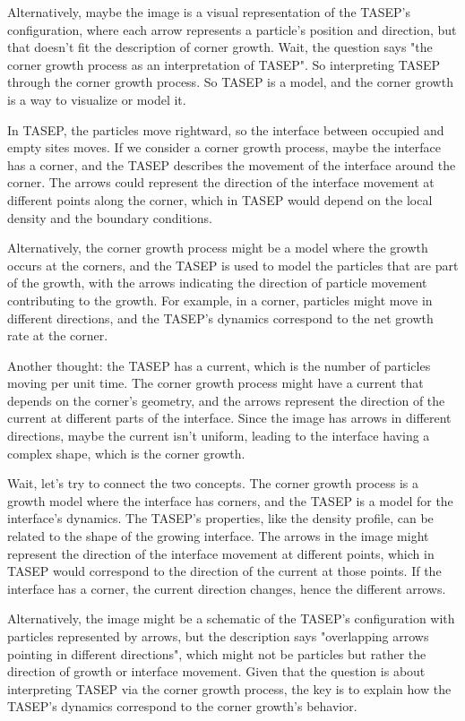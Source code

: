 Alternatively, maybe the image is a visual representation of the TASEP's configuration, where each arrow represents a particle's position and direction, but that doesn't fit the description of corner growth. Wait, the question says "the corner growth process as an interpretation of TASEP". So interpreting TASEP through the corner growth process. So TASEP is a model, and the corner growth is a way to visualize or model it.

In TASEP, the particles move rightward, so the interface between occupied and empty sites moves. If we consider a corner growth process, maybe the interface has a corner, and the TASEP describes the movement of the interface around the corner. The arrows could represent the direction of the interface movement at different points along the corner, which in TASEP would depend on the local density and the boundary conditions.

Alternatively, the corner growth process might be a model where the growth occurs at the corners, and the TASEP is used to model the particles that are part of the growth, with the arrows indicating the direction of particle movement contributing to the growth. For example, in a corner, particles might move in different directions, and the TASEP's dynamics correspond to the net growth rate at the corner.

Another thought: the TASEP has a current, which is the number of particles moving per unit time. The corner growth process might have a current that depends on the corner's geometry, and the arrows represent the direction of the current at different parts of the interface. Since the image has arrows in different directions, maybe the current isn't uniform, leading to the interface having a complex shape, which is the corner growth.

Wait, let's try to connect the two concepts. The corner growth process is a growth model where the interface has corners, and the TASEP is a model for the interface's dynamics. The TASEP's properties, like the density profile, can be related to the shape of the growing interface. The arrows in the image might represent the direction of the interface movement at different points, which in TASEP would correspond to the direction of the current at those points. If the interface has a corner, the current direction changes, hence the different arrows.

Alternatively, the image might be a schematic of the TASEP's configuration with particles represented by arrows, but the description says "overlapping arrows pointing in different directions", which might not be particles but rather the direction of growth or interface movement. Given that the question is about interpreting TASEP via the corner growth process, the key is to explain how the TASEP's dynamics correspond to the corner growth's behavior.

